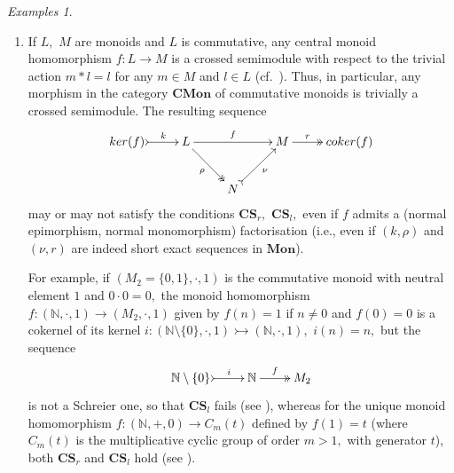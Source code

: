 \documentclass[a4paper]{amsart}
\theoremstyle{plain}
\theoremstyle{definition}
\theoremstyle{remark}
\newtheorem{examples}[subsection]{Examples}
\begin{document}
\begin{examples}
\begin{enumerate}
\item If $L,$ $M$ are monoids and $L$ is commutative, any central monoid homomorphism $f\colon L\rightarrow M$ is a crossed semimodule with respect to the trivial action $m\ast l=l$ for any $m\in M$ and $l\in L$ (cf.~\cite[Example 3.3.3]{schreier_book}). Thus, in particular, any morphism in the category $\mathbf{CMon}$ of commutative monoids is trivially a crossed semimodule. The resulting sequence
\begin{equation*}
\xymatrix{
{ker(f)} \ar@{>->}[r]^-k &L \ar@{->>}[rd]_-{\rho} \ar[rr]^-f &\ &M \ar@{->>}[r]^-r &{coker(f)} \\
&\ &N \ar@{>->}[ru]_-{\nu} &\ &\
}
\end{equation*}
may or may not satisfy the conditions $\mathbf{CS}_r,$ $\mathbf{CS}_l,$ even if $f$ admits a (normal epimorphism, normal monomorphism) factorisation (i.e., even if $(k,\rho)$ and $(\nu,r)$ are indeed short exact sequences in $\mathbf{Mon}$).

For example, if $(M_2=\{0,1\},\cdot,1)$ is the commutative monoid with neutral element $1$ and $0\cdot 0=0,$ the monoid homomorphism $f\colon(\mathbb{N},\cdot,1)\rightarrow(M_2,\cdot,1)$ given by $f(n)=1$ if $n\neq0$ and $f(0)=0$ is a cokernel of its kernel $i\colon(\mathbb{N}\setminus\{0\},\cdot,1)\rightarrowtail(\mathbb{N},\cdot,1),$ $i(n)=n,$ but the sequence
\begin{equation*}
\xymatrix{{\mathbb{N}\setminus\{0\}}  \ar@{>->}[r]^-i &{\mathbb{N}} \ar@{->>}[r]^-f &{M_2}}
\end{equation*}
is not a Schreier one, so that $\mathbf{CS}_l$ fails (see \cite[Example 2.10.6]{AMR}), whereas for the unique monoid homomorphism $f\colon(\mathbb{N},+,0)\rightarrow C_m(t)$ defined by $f(1)=t$ (where $C_m(t)$ is the multiplicative cyclic group of order $m>1,$ with generator $t$), both $\mathbf{CS}_r$ and $\mathbf{CS}_l$ hold (see \cite[Example 4.2]{P-II}).
\end{enumerate}
\end{examples}
\end{document}
